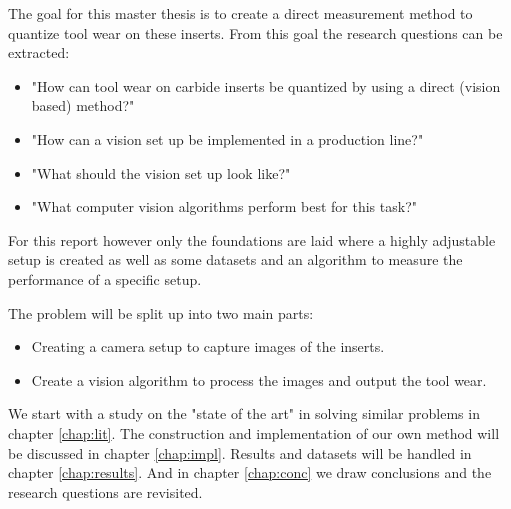      
     The goal for this master thesis is to create a direct measurement method to quantize tool wear on these inserts. From this goal the research questions can be extracted: 
     \begin{itemize}
     	\item "How can tool wear on carbide inserts be quantized by using a direct (vision based) method?"
     	\item "How can a vision set up be implemented in a production line?"
     	\item "What should the vision set up look like?"
     	\item "What computer vision algorithms perform best for this task?"
     \end{itemize}
     	
     	
     For this report however only the foundations are laid where a highly adjustable setup is created as well as some datasets and an algorithm to measure the performance of a specific setup.
     
     
The problem will be split up into two main parts: 
	\begin{itemize}
		\item Creating a camera setup to capture images of the inserts.
		\item Create a vision algorithm to process the images and output the tool wear.
	\end{itemize}
	
We start with a study on the "state of the art" in solving similar problems in chapter \ref{chap:lit}. The construction and implementation of our own method will be discussed in chapter \ref{chap:impl}. Results and datasets will be handled in chapter \ref{chap:results}. And in chapter \ref{chap:conc} we draw conclusions and the research questions are revisited.
	
